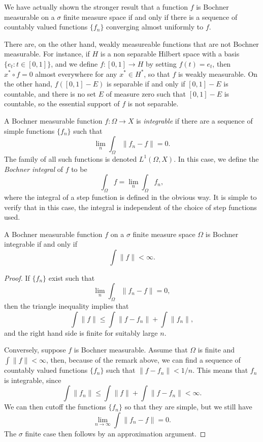 \begin{remark}
    We have actually shown the stronger result that a function $f$ is Bochner measurable on a $\sigma$ finite measure space if and only if there is a sequence of countably valued functions $\{ f_n \}$ converging almost uniformly to $f$.
\end{remark}

There are, on the other hand, weakly measureable functions that are not Bochner measurable. For instance, if $H$ is a non separable Hilbert space with a basis $\{ e_t : t \in [0,1] \}$, and we define $f: [0,1] \to H$ by setting $f(t) = e_t$, then $x^* \circ f = 0$ almost everywhere for any $x^* \in H^*$, so that $f$ is weakly measurable. On the other hand, $f([0,1] - E)$ is separable if and only if $[0,1] - E$ is countable, and there is no set $E$ of measure zero such that $[0,1] - E$ is countable, so the essential support of $f$ is not separable.

A Bochner measurable function $f: \Omega \to X$ is \emph{integrable} if there are a sequence of simple functions $\{ f_n \}$ such that
%
\[ \lim_n \int_\Omega \| f_n - f \| = 0. \]
%
The family of all such functions is denoted $L^1(\Omega,X)$. In this case, we define the \emph{Bochner integral} of $f$ to be
%
\[ \int_\Omega f = \lim_n \int_\Omega f_n, \]
%
where the integral of a step function is defined in the obvious way. It is simple to verify that in this case, the integral is independent of the choice of step functions used.

\begin{theorem}
    A Bochner measurable function $f$ on a $\sigma$ finite measure space $\Omega$ is Bochner integrable if and only if
    \[ \int \| f \| < \infty. \]
\end{theorem}
\begin{proof}
    If $\{ f_n \}$ exist such that
    \[ \lim_n \int_\Omega \| f_n - f \| = 0, \]
    then the triangle inequality implies that
    \[ \int \| f \| \leq \int \| f - f_n \| + \int \| f_n \|, \]
    and the right hand side is finite for suitably large $n$.

    Conversely, suppose $f$ is Bochner measurable. Assume that $\Omega$ is finite and $\int \| f \| < \infty$, then, because of the remark above, we can find a sequence of countably valued functions $\{ f_n \}$ such that $\| f - f_n \| < 1/n$. This means that $f_n$ is integrable, since
    \[ \int \| f_n \| \leq \int \| f \| + \int \| f - f_n \| < \infty. \]
    We can then cutoff the functions $\{ f_n \}$ so that they are simple, but we still have
    \[ \lim_{n \to \infty} \int \| f_n - f \| = 0. \]
    The $\sigma$ finite case then follows by an approximation argument.
\end{proof}

